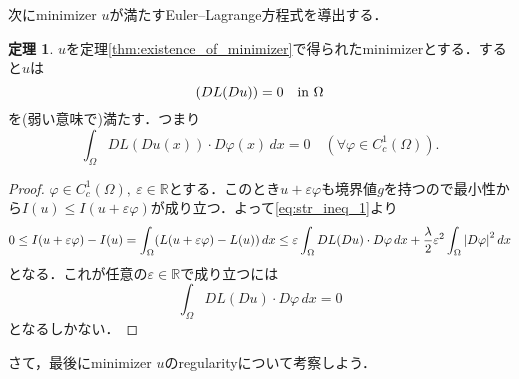 \documentclass[a4paper]{ltjsarticle}
\newcommand{\Rset}{\mathbb{R}}
\newcommand{\Om}{\Omega}
\newcommand{\inn}{\quad\text{in}\ }
\newcommand{\1}{\mathbbm{1}}
\let\div\relax
\DeclareMathOperator{\div}{\mathrm{div}}
\numberwithin{equation}{section}
\theoremstyle{definition}
\newtheorem{thm}{定理}[section]
\begin{document}
次にminimizer $u$が満たすEuler--Lagrange方程式を導出する．
\begin{thm}
    $u$を定理\ref{thm:existence_of_minimizer}で得られたminimizerとする．すると$u$は
    \begin{equation}
        \div(DL(Du))=0\inn \Om \label{eq:euler_lagrange}
    \end{equation}
    を(弱い意味で)満たす．つまり
    \begin{equation}
        \int_{\Om}DL(Du(x))\cdot D\varphi(x)\,dx=0\quad (\forall \varphi\in C^1_c(\Om)).
    \end{equation}
\end{thm}
\begin{proof}
    $\varphi\in C^1_c(\Om),\ \varepsilon\in\Rset$とする．このとき$u+\varepsilon \varphi$も境界値$g$を持つので最小性から$I(u)\leq I(u+\varepsilon\varphi)$が成り立つ．よって\eqref{eq:str_ineq_1}より
    \begin{equation}
        0\leq I(u+\varepsilon\varphi)-I(u)=\int_{\Om}(L(u+\varepsilon\varphi)-L(u))\,dx\leq \varepsilon\int_{\Om}DL(Du)\cdot D\varphi\,dx+\frac{\lambda}{2}\varepsilon^2\int_{\Om}\abs{D\varphi}^2\,dx
    \end{equation}
    となる．これが任意の$\varepsilon\in\Rset$で成り立つには
    \begin{equation}
        \int_{\Om}DL(Du)\cdot D\varphi\,dx=0
    \end{equation}
    となるしかない．
\end{proof}
さて，最後にminimizer $u$のregularityについて考察しよう．
\end{document}
